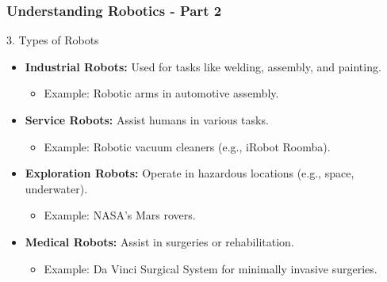 \documentclass[aspectratio=169]{beamer}
\begin{document}
\begin{frame}[fragile]
    \frametitle{Understanding Robotics - Part 2}
    \begin{block}{3. Types of Robots}
        \begin{itemize}
            \item \textbf{Industrial Robots:} Used for tasks like welding, assembly, and painting. 
                \begin{itemize}
                    \item Example: Robotic arms in automotive assembly.
                \end{itemize}
            \item \textbf{Service Robots:} Assist humans in various tasks. 
                \begin{itemize}
                    \item Example: Robotic vacuum cleaners (e.g., iRobot Roomba).
                \end{itemize}
            \item \textbf{Exploration Robots:} Operate in hazardous locations (e.g., space, underwater).
                \begin{itemize}
                    \item Example: NASA's Mars rovers.
                \end{itemize}
            \item \textbf{Medical Robots:} Assist in surgeries or rehabilitation. 
                \begin{itemize}
                    \item Example: Da Vinci Surgical System for minimally invasive surgeries.
                \end{itemize}
        \end{itemize}
    \end{block}
\end{frame}
\end{document}
